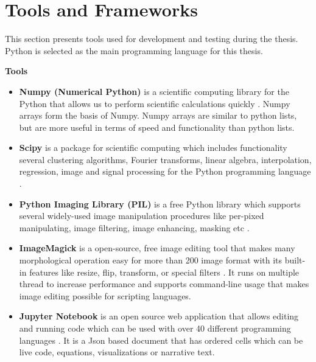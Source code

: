 \section{Tools and Frameworks}

    This section presents tools used for development and testing during the thesis. Python is selected as the main programming language for this thesis.

    \textbf{Tools}

        \begin{itemize}

            \item \textbf{Numpy (Numerical Python)} is a scientific computing library for the Python that allows us
                    to perform scientific calculations quickly \cite{oliphant2006guide}. Numpy arrays form the basis of Numpy.
                    Numpy arrays are similar to python lists, but are more useful in terms of speed and functionality than python lists.

            \item \textbf{Scipy} is a package for scientific computing which includes functionality several clustering algorithms,
                    Fourier transforms, linear algebra, interpolation, regression, image and signal processing for the Python programming language \cite{virtanen2020scipy}.

            \item \textbf{Python Imaging Library (PIL)} is a free Python library which supports several widely-used image manipulation procedures
                    like per-pixed manipulating, image filtering, image enhancing, masking etc \cite{anjal2019roi}.

            \item \textbf{ImageMagick} is a open-source, free image editing tool that makes many morphological operation easy
                    for more than 200 image format with its built-in features like resize, flip, transform, or special filters \cite{ImageMag68online}.
                    It runs on multiple thread to increase performance and supports command-line usage that makes image editing possible for scripting languages.

            \item \textbf{Jupyter Notebook} is an open source web application that allows editing and running code
                    which can be used with over 40 different programming languages \cite{kluyver2016jupyter}.
                    It is a Json based document that has ordered cells which can be live code, equations, visualizations or narrative text.

        \end{itemize}

